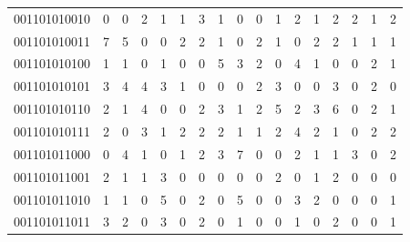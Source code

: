 \documentclass[10pt,a4paper]{article}
\begin{document}
\begin{longtable}{ |c|c|c|c|c|c|c|c|c|c|c|c|c|c|c|c|c| }
    001101010010              & 0                            & 0                                & 2                            & 1                              & 1   & 3   & 1   & 0   & 0   & 1   & 2   & 1   & 2   & 2   & 1   & 2   \\
    001101010011              & 7                            & 5                                & 0                            & 0                              & 2   & 2   & 1   & 0   & 2   & 1   & 0   & 2   & 2   & 1   & 1   & 1   \\
    001101010100              & 1                            & 1                                & 0                            & 1                              & 0   & 0   & 5   & 3   & 2   & 0   & 4   & 1   & 0   & 0   & 2   & 1   \\
    001101010101              & 3                            & 4                                & 4                            & 3                              & 1   & 0   & 0   & 0   & 2   & 3   & 0   & 0   & 3   & 0   & 2   & 0   \\
    001101010110              & 2                            & 1                                & 4                            & 0                              & 0   & 2   & 3   & 1   & 2   & 5   & 2   & 3   & 6   & 0   & 2   & 1   \\
    001101010111              & 2                            & 0                                & 3                            & 1                              & 2   & 2   & 2   & 1   & 1   & 2   & 4   & 2   & 1   & 0   & 2   & 2   \\
    001101011000              & 0                            & 4                                & 1                            & 0                              & 1   & 2   & 3   & 7   & 0   & 0   & 2   & 1   & 1   & 3   & 0   & 2   \\
    001101011001              & 2                            & 1                                & 1                            & 3                              & 0   & 0   & 0   & 0   & 0   & 2   & 0   & 1   & 2   & 0   & 0   & 0   \\
    001101011010              & 1                            & 1                                & 0                            & 5                              & 0   & 2   & 0   & 5   & 0   & 0   & 3   & 2   & 0   & 0   & 0   & 1   \\
    001101011011              & 3                            & 2                                & 0                            & 3                              & 0   & 2   & 0   & 1   & 0   & 0   & 1   & 0   & 2   & 0   & 0   & 1   \\

\end{longtable}
\end{document}
